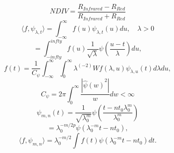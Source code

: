 \documentclass{article}
\begin{document}
\[NDIV=\frac{R_{Infrared}-R_{Red}}{R_{Infrared}+R_{Red}}\]
\[\langle{f,\psi_{\lambda,t}}\rangle=\int_{-\infty}^{\infty}f(u)\psi_{\lambda,t}(u)du,\quad{\lambda>0}\]
\[=\int_{-infty}^{infty}f(u)\frac{1}{\sqrt{\lambda}}\psi\left(\frac{u-t}{\lambda}\right)du,\]
\[f(t)=\frac{1}{C_\psi}\int_{-\infty}^{\infty}\int_{0}^{\infty}\lambda^(-2)Wf(\lambda,u)\psi_{\lambda,u}(t)d{\lambda}du,\]
\[C_\psi=2\pi\int_{0}^{\infty}\frac{|{\hat{\psi}(w)}^{2}|}{w}dw<\infty\]
\[\psi_{m,n}(t)=\frac{1}{\sqrt{\lambda^m_0}}\psi\left(\frac{t-nt_0\lambda^m_0}{\lambda^m_0}\right)\]
\[=\lambda^{-m/2p}_0\psi(\lambda^{-m}_0t-nt_0),\]
\[\langle{f,\psi_{m,n}}\rangle=\lambda^{-m/2}_0{\int}f(t)\psi(\lambda^{-m}_0t-nt_0)dt.\]
\end{document}

